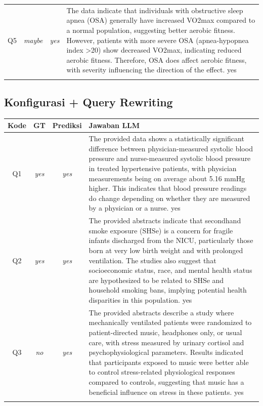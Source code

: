 \begin{longtable}{@{}c c c >{\raggedright\arraybackslash}p{8.8cm}@{}}
\addlinespace
Q5 & \textit{maybe} & \textit{yes} & The data indicate that individuals with obstructive sleep apnea (OSA) generally have increased VO2max compared to a normal population, suggesting better aerobic fitness. However, patients with more severe OSA (apnea-hypopnea index >20) show decreased VO2max, indicating reduced aerobic fitness. Therefore, OSA does affect aerobic fitness, with severity influencing the direction of the effect. yes \\
\addlinespace
\bottomrule
\end{longtable}

\subsection*{Konfigurasi + Query Rewriting}
\begin{longtable}{@{}c c c >{\raggedright\arraybackslash}p{8.8cm}@{}}
\toprule
\textbf{Kode} & \textbf{GT} & \textbf{Prediksi} & \textbf{Jawaban LLM} \\
\midrule\endhead
Q1 & \textit{yes} & \textit{yes} & The provided data shows a statistically significant difference between physician-measured systolic blood pressure and nurse-measured systolic blood pressure in treated hypertensive patients, with physician measurements being on average about 5.16 mmHg higher. This indicates that blood pressure readings do change depending on whether they are measured by a physician or a nurse. yes \\
\addlinespace
Q2 & \textit{yes} & \textit{yes} & The provided abstracts indicate that secondhand smoke exposure (SHSe) is a concern for fragile infants discharged from the NICU, particularly those born at very low birth weight and with prolonged ventilation. The studies also suggest that socioeconomic status, race, and mental health status are hypothesized to be related to SHSe and household smoking bans, implying potential health disparities in this population. yes \\
\addlinespace
Q3 & \textit{no} & \textit{yes} & The provided abstracts describe a study where mechanically ventilated patients were randomized to patient-directed music, headphones only, or usual care, with stress measured by urinary cortisol and psychophysiological parameters. Results indicated that participants exposed to music were better able to control stress-related physiological responses compared to controls, suggesting that music has a beneficial influence on stress in these patients. yes \\
\addlinespace

\end{longtable}

